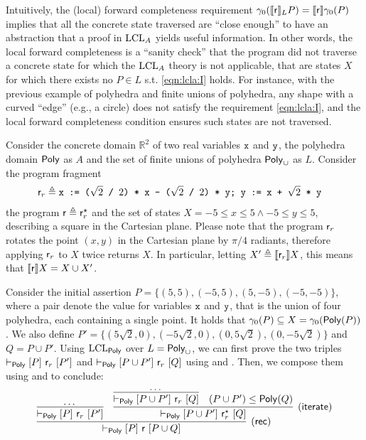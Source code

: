 Intuitively, the (local) forward completeness requirement $\gamma_0(\llbracket\mathsf{r}\rrbracket_L P) = \llbracket\mathsf{r}\rrbracket \gamma_0(P)$ implies that all the concrete state traversed are ``close enough'' to have an abstraction that a proof in $\text{LCL}_A$ yields useful information. In other words, the local forward completeness is a ``sanity check'' that the program did not traverse a concrete state for which the $\text{LCL}_A$ theory is not applicable, that are states $X$ for which there exists no $P \in L$ s.t. \eqref{eqn:lcla:I} holds. For instance, with the previous example of polyhedra and finite unions of polyhedra, any shape with a curved ``edge'' (e.g., a circle) does not satisfy the requirement \eqref{eqn:lcla:I}, and the local forward completeness condition ensures such states are not traversed.
\begin{example}
	Consider the concrete domain $\mathbb{R}^2$ of two real variables $\texttt{x}$ and $\texttt{y}$, the polyhedra domain $\mathsf{Poly}$ as $A$ and the set of finite unions of polyhedra $\mathsf{Poly}_{\cup}$ as $L$.
	Consider the program fragment
	\begin{align*}
		\mathsf{r}_r & \triangleq \texttt{x := ($\sqrt{2}$ / $2$) * x - ($\sqrt{2}$ / $2$) * y; y := x + $\sqrt{2}$ * y}
	\end{align*}
	the program $\mathsf{r} \triangleq \mathsf{r}_r^\star$ and the set of states $X = -5 \le x \le 5 \land -5 \le y \le 5$, describing a square in the Cartesian plane. Please note that the program $\mathsf{r}_r$ rotates the point $(x, y)$ in the Cartesian plane by $\pi / 4$ radiants, therefore applying $\mathsf{r}_r$ to $X$ twice returns $X$. In particular, letting $X' \triangleq \llbracket\mathsf{r}_r\rrbracket X$, this means that $\llbracket\mathsf{r}\rrbracket X = X \cup X'$.

	Consider the initial assertion $P = \{ (5, 5), (-5, 5), (5, -5), (-5, -5) \}$, where a pair denote the value for variables $\texttt{x}$ and $\texttt{y}$, that is the union of four polyhedra, each containing a single point. It holds that $\gamma_0(P) \subseteq X = \gamma_0 (\mathsf{Poly}(P))$. We also define $P' = \{ (5 \sqrt{2}, 0), (- 5 \sqrt{2}, 0), (0, 5 \sqrt{2}), (0, -5 \sqrt{2}) \}$ and $Q = P \cup P'$.
	Using $\text{LCL}_{\mathsf{Poly}}$ over $L=\mathsf{Poly}_{\cup}$, we can first prove the two triples $\vdash_{\mathsf{Poly}}\nobreak[P]~\mathsf{r}_r~[P']$ and $\vdash_{\mathsf{Poly}}\nobreak[P \cup P']~\mathsf{r}_r~[Q]$ using  and . Then, we compose them using  and  to conclude:
	\[
	\infer[\lclrule{rec}]
	{\lcl{\Poly}{P}{\regr}{P \cup Q}}
	{
		\infer{\lcl{\Poly}{P}{\regr_r}{P'}}{\dots}
		&
		\infer[\lclrule{iterate}]
		{\lcl{\Poly}{P \cup P'}{\regr_r^\kstar}{Q}}
		{
			\infer{\lcl{\Poly}{P \cup P'}{\regr_r}{Q}}{\dots}
			&
			(P \cup P') \le \Poly(Q)
		}
	}
	\]


\end{example}
